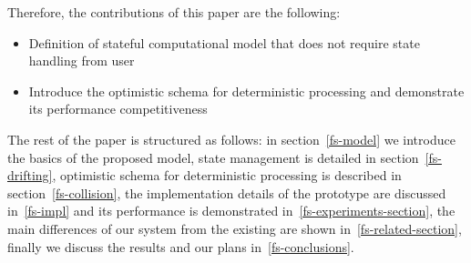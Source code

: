 Therefore, the contributions of this paper are the following:

\begin {itemize}
\item Definition of stateful computational model that does not require state handling from user
\item Introduce the optimistic schema for deterministic processing and demonstrate its performance competitiveness
\end {itemize}

The rest of the paper is structured as follows: in section~\ref{fs-model} we introduce the basics of the proposed model, state management is detailed in section~\ref{fs-drifting}, optimistic schema for deterministic processing is described in section~\ref{fs-collision}, the implementation details of the prototype are discussed in~\ref{fs-impl} and its performance is demonstrated in~\ref{fs-experiments-section}, the main differences of our system from the existing are shown in~\ref{fs-related-section}, finally we discuss the results and our plans in~\ref{fs-conclusions}.

\endinput
